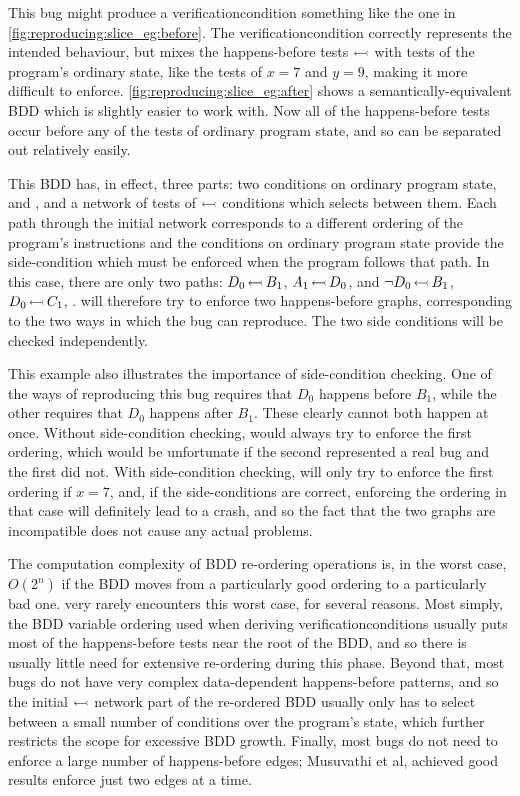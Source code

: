 This bug might produce a \gls{verificationcondition} something like
the one in \autoref{fig:reproducing:slice_eg:before}.  The
\gls{verificationcondition} correctly represents the intended
behaviour, but mixes the happens-before tests $\leftarrowtail$
with tests of the program's ordinary state, like the tests of $x = 7$
and $y = 9$, making it more difficult to enforce.
\autoref{fig:reproducing:slice_eg:after} shows a
semantically-equivalent BDD which is slightly easier to work with.
Now all of the happens-before tests occur before any of the tests of
ordinary program state, and so can be separated out relatively easily.

This BDD has, in effect, three parts: two conditions on ordinary
program state,  and , and a network of tests of
$\leftarrowtail$ conditions which selects between them.  Each path
through the initial network corresponds to a different ordering of the
program's instructions and the conditions on ordinary program state
provide the side-condition which must be enforced when the program
follows that path.  In this case, there are only two paths:
$D_0\,{\leftarrowtail}\,B_1$, $A_1\,{\leftarrowtail}\,D_0$, 
and ${\neg}D_0\,{\leftarrowtail}\,B_1$, $D_0\,{\leftarrowtail}\,C_1$,
.  {\Technique} will therefore try to enforce two
happens-before graphs, corresponding to the two ways in which the bug
can reproduce.  The two side conditions will be checked independently.

This example also illustrates the importance of side-condition
checking.  One of the ways of reproducing this bug requires that $D_0$
happens before $B_1$, while the other requires that $D_0$ happens
after $B_1$.  These clearly cannot both happen at once.  Without
side-condition checking, {\technique} would always try to enforce the
first ordering, which would be unfortunate if the second represented a
real bug and the first did not.  With side-condition checking,
{\technique} will only try to enforce the first ordering if $x = 7$,
and, if the side-conditions are correct, enforcing the ordering in
that case will definitely lead to a crash, and so the fact that the
two graphs are incompatible does not cause any actual problems.

The computation complexity of BDD re-ordering operations is, in the
worst case, $O(2^n)$ if the BDD moves from a particularly good
ordering to a particularly bad one.  {\Technique} very rarely
encounters this worst case, for several reasons.  Most simply, the BDD
variable ordering used when deriving \glspl{verificationcondition}
usually puts most of the happens-before tests near the root of the
BDD, and so there is usually little need for extensive re-ordering
during this phase.  Beyond that, most bugs do not have very complex
data-dependent happens-before patterns, and so the initial
$\leftarrowtail$ network part of the re-ordered BDD usually only
has to select between a small number of conditions over the program's
state, which further restricts the scope for excessive BDD growth.
Finally, most bugs do not need to enforce a large number of
happens-before edges; Musuvathi et al\cite{Musuvathi2007}, achieved
good results enforce just two edges at a time.

